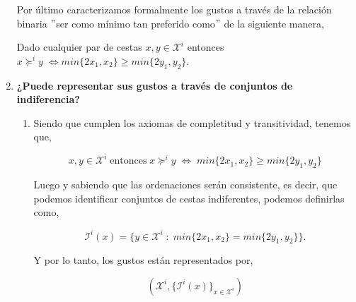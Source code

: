\begin{enumerate}
\begin{center}
	\end{center}
	\vspace{.5cm}

	Por último caracterizamos formalmente los gustos a través de la relación binaria $"$ser como mínimo tan preferido como$"$ de la siguiente manera,\\
	\begin{tcolorbox}[colframe=white]
	\begin{center}
	    Dado cualquier par de cestas $x,y \in \mathcal{X}^i$ entonces $x \succeq^i y \; \Longleftrightarrow min\lbrace 2x_1,x_2 \rbrace \geq min\lbrace 2y_1, y_2\rbrace$.
	\end{center}
	\end{tcolorbox}
	\vspace{1cm}

    \item \textbf{¿Puede representar sus gustos a través de conjuntos de indiferencia?}\\

	\begin{enumerate}[\bfseries (2.1)]

	    \item Siendo que cumplen los axiomas de completitud y transitividad, tenemos que,\\
		\begin{tcolorbox}[colframe=white]
		$$x,y\in \mathcal{X}^i \; \mbox{entonces} \; x\succeq^i y \; \Longleftrightarrow \; min\lbrace 2x_1,x_2\rbrace \geq min\lbrace 2y_1,y_2\rbrace$$
		\end{tcolorbox}
		Luego y sabiendo que las ordenaciones serán consistente, es decir, que podemos identificar conjuntos de cestas indiferentes, podemos definirlas como, \\
		\begin{tcolorbox}[colframe=white]
		$$\mathcal{I}^i(x) = \lbrace y\in \mathcal{X}^i\; : \;  min\lbrace 2x_1,x_2 \rbrace = min\lbrace 2y_1, y_2 \rbrace \rbrace.$$
		\end{tcolorbox}
		Y por lo tanto, los gustos están representados por,\\
		\begin{tcolorbox}[colframe=white]
		$$\left(\mathcal{X}^i,\lbrace \mathcal{I}^i(x)\rbrace_{x\in \mathcal{X}^i}\right)$$
		\end{tcolorbox}
		\vspace{1cm}


\end{enumerate}
\end{enumerate}
